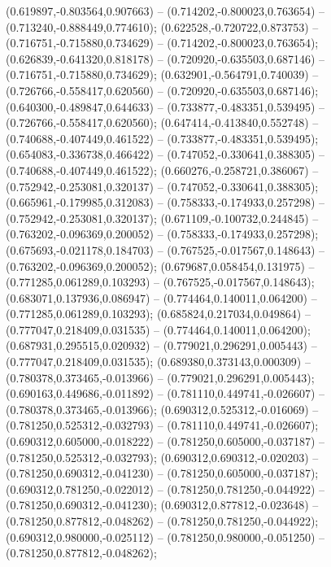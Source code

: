  (0.619897,-0.803564,0.907663) -- (0.714202,-0.800023,0.763654) -- (0.713240,-0.888449,0.774610);
 (0.622528,-0.720722,0.873753) -- (0.716751,-0.715880,0.734629) -- (0.714202,-0.800023,0.763654);
 (0.626839,-0.641320,0.818178) -- (0.720920,-0.635503,0.687146) -- (0.716751,-0.715880,0.734629);
 (0.632901,-0.564791,0.740039) -- (0.726766,-0.558417,0.620560) -- (0.720920,-0.635503,0.687146);
 (0.640300,-0.489847,0.644633) -- (0.733877,-0.483351,0.539495) -- (0.726766,-0.558417,0.620560);
 (0.647414,-0.413840,0.552748) -- (0.740688,-0.407449,0.461522) -- (0.733877,-0.483351,0.539495);
 (0.654083,-0.336738,0.466422) -- (0.747052,-0.330641,0.388305) -- (0.740688,-0.407449,0.461522);
 (0.660276,-0.258721,0.386067) -- (0.752942,-0.253081,0.320137) -- (0.747052,-0.330641,0.388305);
 (0.665961,-0.179985,0.312083) -- (0.758333,-0.174933,0.257298) -- (0.752942,-0.253081,0.320137);
 (0.671109,-0.100732,0.244845) -- (0.763202,-0.096369,0.200052) -- (0.758333,-0.174933,0.257298);
 (0.675693,-0.021178,0.184703) -- (0.767525,-0.017567,0.148643) -- (0.763202,-0.096369,0.200052);
 (0.679687,0.058454,0.131975) -- (0.771285,0.061289,0.103293) -- (0.767525,-0.017567,0.148643);
 (0.683071,0.137936,0.086947) -- (0.774464,0.140011,0.064200) -- (0.771285,0.061289,0.103293);
 (0.685824,0.217034,0.049864) -- (0.777047,0.218409,0.031535) -- (0.774464,0.140011,0.064200);
 (0.687931,0.295515,0.020932) -- (0.779021,0.296291,0.005443) -- (0.777047,0.218409,0.031535);
 (0.689380,0.373143,0.000309) -- (0.780378,0.373465,-0.013966) -- (0.779021,0.296291,0.005443);
 (0.690163,0.449686,-0.011892) -- (0.781110,0.449741,-0.026607) -- (0.780378,0.373465,-0.013966);
 (0.690312,0.525312,-0.016069) -- (0.781250,0.525312,-0.032793) -- (0.781110,0.449741,-0.026607);
 (0.690312,0.605000,-0.018222) -- (0.781250,0.605000,-0.037187) -- (0.781250,0.525312,-0.032793);
 (0.690312,0.690312,-0.020203) -- (0.781250,0.690312,-0.041230) -- (0.781250,0.605000,-0.037187);
 (0.690312,0.781250,-0.022012) -- (0.781250,0.781250,-0.044922) -- (0.781250,0.690312,-0.041230);
 (0.690312,0.877812,-0.023648) -- (0.781250,0.877812,-0.048262) -- (0.781250,0.781250,-0.044922);
 (0.690312,0.980000,-0.025112) -- (0.781250,0.980000,-0.051250) -- (0.781250,0.877812,-0.048262);
